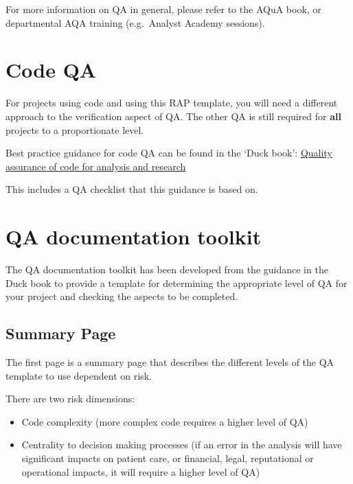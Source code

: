 \documentclass[
  letterpaper,
]{book}
\providecommand{\tightlist}{%
  \setlength{\itemsep}{0pt}\setlength{\parskip}{0pt}}\usepackage{longtable,booktabs,array}
\begin{document}
For more information on QA in general, please refer to the AQuA book, or
departmental AQA training (e.g.~Analyst Academy sessions).

\hypertarget{code-qa}{%
\section{Code QA}\label{code-qa}}

For projects using code and using this RAP template, you will need a
different approach to the verification aspect of QA. The other QA is
still required for \textbf{all} projects to a proportionate level.

Best practice guidance for code QA can be found in the `Duck book':
\href{https://best-practice-and-impact.github.io/qa-of-code-guidance/intro.html}{Quality
assurance of code for analysis and research}

This includes a QA checklist that this guidance is based on.

\hypertarget{qa-documentation-toolkit}{%
\section{QA documentation toolkit}\label{qa-documentation-toolkit}}

The QA documentation toolkit has been developed from the guidance in the
Duck book to provide a template for determining the appropriate level of
QA for your project and checking the aspects to be completed.

\hypertarget{summary-page}{%
\subsection{Summary Page}\label{summary-page}}

The first page is a summary page that describes the different levels of
the QA template to use dependent on risk.

There are two risk dimensions:

\begin{itemize}
\tightlist
\item
  Code complexity (more complex code requires a higher level of QA)
\item
  Centrality to decision making processes (if an error in the analysis
  will have significant impacts on patient care, or financial, legal,
  reputational or operational impacts, it will require a higher level of
  QA)
\end{itemize}
\end{document}

